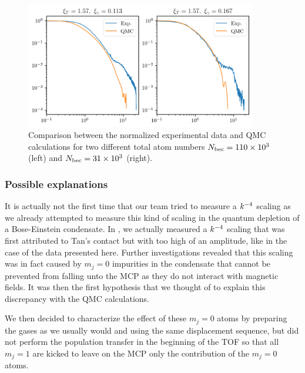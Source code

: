 \begin{figure}
    \centering
    \includegraphics[width=0.9\textwidth]{Fig/Chapter5/QMC_comparison.png}
    \caption{Comparison between the normalized experimental data and QMC calculations for two different total atom numbers $N_{\rm{bec}}=110 \times 10^3$ (left) and $N_{\rm{bec}}=31 \times 10^3$ (right).}
    \label{fig:1D_QMC_comparison}
\end{figure}

\subsubsection{Possible explanations}

It is actually not the first time that our team tried to measure a $k^{-4}$ scaling as we already attempted to measure this kind of scaling in the quantum depletion of a Bose-Einstein condensate. In \cite{chang2016momentum}, we actually measured a $k^{-4}$ scaling that was first attributed to Tan's contact but with too high of an amplitude, like in the case of the data presented here. Further investigations revealed that this scaling was in fact caused by $m_j=0$ impurities in the condensate that cannot be prevented from falling unto the MCP as they do not interact with magnetic fields. It was then the first hypothesis that we thought of to explain this discrepancy with the QMC calculations.

We then decided to characterize the effect of these $m_j=0$ atoms by preparing the gases as we usually would and using the same displacement sequence, but did not perform the population transfer in the beginning of the TOF so that all $m_j=1$ are kicked to leave on the MCP only the contribution of the $m_j=0$ atoms. 

